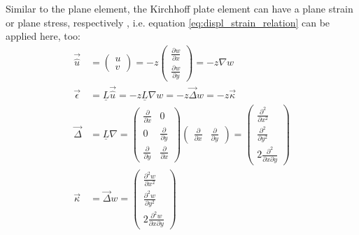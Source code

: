   Similar to the plane element, the Kirchhoff plate element can have a plane strain or plane stress, respectively \cite{steinke2005finite}, i.e. equation \ref{eq:displ_strain_relation} can be applied here, too:
  \begin{align}
  \vec{\hat{u}} &= \begin{pmatrix}
  u\\v
  \end{pmatrix} = -z \begin{pmatrix}
  \frac{\partial w}{\partial x}\\ \frac{\partial w}{\partial y}
  \end{pmatrix} = -z \nabla w \nonumber\\
  \vec{\epsilon} &= \underline{L} \vec{\hat{u}} = -z \underline{L} \nabla w = -z \vec{\Delta} w = -z \vec{\kappa} \label{eq:eps=-z*kappa}\\
  \vec{\Delta} &= \underline{L} \nabla = \begin{pmatrix}
  \frac{\partial}{\partial x} & 0\\
  0 & \frac{\partial}{\partial y}\\
  \frac{\partial}{\partial y} & \frac{\partial}{\partial x}
  \end{pmatrix} \begin{pmatrix}
  \frac{\partial}{\partial x} & \frac{\partial}{\partial y}
  \end{pmatrix} = \begin{pmatrix}
  \frac{\partial^2}{\partial x^2}\\
  \frac{\partial^2}{\partial y^2}\\
  2\frac{\partial^2}{\partial x\partial y}
  \end{pmatrix} \nonumber\\
  \vec{\kappa} &= \vec{\Delta}w = \begin{pmatrix}
  \frac{\partial^2w}{\partial x^2}\\
  \frac{\partial^2w}{\partial y^2}\\
  2\frac{\partial^2w}{\partial x\partial y}
  \end{pmatrix} \label{eq:kappa=Delta*w}
  \end{align}
  
